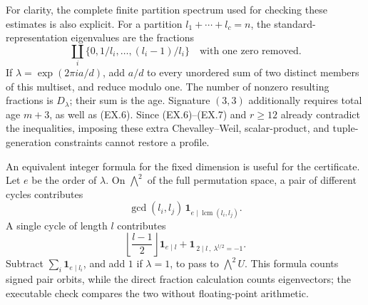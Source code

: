 For clarity, the complete finite partition spectrum used for checking
these estimates is also explicit.  For a partition
$l_1+\cdots+l_c=n$, the standard-representation eigenvalues are the
fractions
\[
 \coprod_i\{0,1/l_i,\ldots,(l_i-1)/l_i\}
                  \quad\text{with one zero removed}.
\]
If $\lambda=\exp(2\pi i a/d)$, add $a/d$ to every unordered sum
of two distinct members of this multiset, and reduce modulo one.
The number of nonzero resulting fractions is $D_\lambda$; their
sum is the age.  Signature $(3,3)$ additionally requires total
age $m+3$, as well as (EX.6).  Since (EX.6)--(EX.7) and $r\ge12$
already contradict the inequalities, imposing these extra
Chevalley--Weil, scalar-product, and tuple-generation constraints
cannot restore a profile.

An equivalent integer formula for the fixed dimension is useful
for the certificate.  Let $e$ be the order of $\lambda$.  On
$\bigwedge^2$ of the full permutation space, a pair of different
cycles contributes
\[
       \gcd(l_i,l_j)\,\mathbf1_{e\mid\operatorname{lcm}(l_i,l_j)}.
\]
A single cycle of length $l$ contributes
\[
  \left\lfloor\frac{l-1}{2}\right\rfloor\mathbf1_{e\mid l}
       +\mathbf1_{\,2\mid l\,,\ \lambda^{l/2}=-1}.
\]
Subtract $\sum_i\mathbf1_{e\mid l_i}$, and add $1$ if
$\lambda=1$, to pass to $\bigwedge^2U$.
This formula counts signed pair orbits, while the direct fraction
calculation counts eigenvectors; the executable check compares the
two without floating-point arithmetic.
